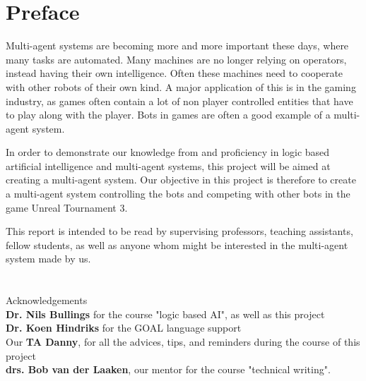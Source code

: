 \chapter*{Preface}
Multi-agent systems are becoming more and more important these days, where many tasks are automated. Many machines are no longer relying on operators, instead having their own intelligence. Often these machines need to cooperate with other robots of their own kind. A major application of this is in the gaming industry, as games often contain a lot of non player controlled entities that have to play along with the player. Bots in games are often a good example of a multi-agent system.

In order to demonstrate our knowledge from and proficiency in logic based artificial intelligence and multi-agent systems, this project will be aimed at creating a multi-agent system. Our objective in this project is therefore to create a multi-agent system controlling the bots and competing with other bots in the game Unreal Tournament 3. 
    
This report is intended to be read by supervising professors, teaching assistants, fellow students, as well as anyone whom might be interested in the multi-agent system made by us.
\\
\\
\\
Acknowledgements \\
    \textbf{Dr. Nils Bullings} for the course "logic based AI", as well as this project \\
    \textbf{Dr. Koen Hindriks} for the GOAL language support \\
    Our \textbf{TA Danny}, for all the advices, tips, and reminders during the course of this project \\
    \textbf{drs. Bob van der Laaken}, our mentor for the course "technical writing". \\
